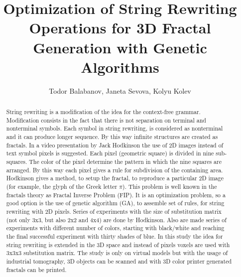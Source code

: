 \documentclass{llncs}
\begin{document}
\title{Optimization of String Rewriting Operations for 3D Fractal Generation with Genetic Algorithms}

\author{Todor Balabanov, Janeta Sevova, Kolyu Kolev}



\maketitle

\begin{abstract}
String rewriting is a modification of the idea for the context-free grammar. Modification consists in the fact that there is not separation on terminal and nonterminal symbols. Each symbol in string rewriting, is considered as nonterminal and it can produce longer sequence. By this way infinite structures are created as fractals. In a video presentation by Jack Hodkinson the use of 2D images instead of text symbol pixels is suggested. Each pixel (geometric square) is divided in nine sub-squares. The color of the pixel determine the pattern in which the nine squares are arranged. By this way each pixel gives a rule for subdivision of the containing area. Hodkinson gives a method, to setup the fractal, to reproduce a particular 2D image (for example, the glyph of the Greek letter $\pi$). This problem is well known in the fractals theory as Fractal Inverse Problem (FIP). It is an optimization problem, so a good option is the use of genetic algorithm (GA), to assemble set of rules, for string rewriting with 2D pixels. Series of experiments with the size of substitution matrix (not only 3x3, but also 2x2 and 4x4) are done by Hodkinson. Also are made series of experiments with different number of colors, starting with black/white and reaching the final successful experiment with thirty shades of blue. In this study the idea for string rewriting is extended in the 3D space and instead of pixels voxels are used with 3x3x3 substitution matrix. The study is only on virtual models but with the usage of industrial tomography, 3D objects can be scanned and with 3D color printer generated fractals can be printed.
\end{abstract}
\end{document}
